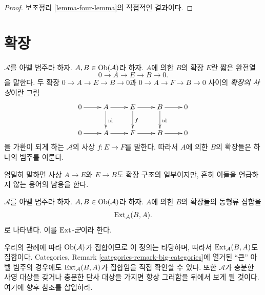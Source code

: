 \begin{proof}
보조정리 \ref{lemma-four-lemma}의 직접적인 결과이다.
\end{proof}








\section{확장}
\label{section-extensions}

\begin{definition}
\label{definition-extension}
$\mathcal{A}$를 아벨 범주라 하자.
$A, B \in \mathop{\mathrm{Ob}}\nolimits(\mathcal{A})$라 하자. {$A$에 의한 $B$의 확장 $E$}란
짧은 완전열
$$
0 \to A \to E \to B \to 0.
$$
을 말한다. 두 확장 $0 \to A \to E \to B \to 0$과
$0 \to A \to F \to B \to 0$ 사이의 {\it 확장의 사상}이란
그림
$$
\xymatrix{
0 \ar[r] &
A \ar[r] \ar[d]^{\text{id}} &
E \ar[r] \ar[d]^f &
B \ar[r] \ar[d]^{\text{id}} &
0 \\
0 \ar[r] &
A \ar[r] &
F \ar[r] &
B \ar[r] &
0
}
$$
을 가환이 되게 하는 $\mathcal{A}$의 사상 $f : E \to F$를 말한다.
따라서 $A$에 의한 $B$의 확장들은 하나의 범주를 이룬다.
\end{definition}

\noindent
엄밀히 말하면 사상 $A \to E$와 $E \to B$도 확장 구조의 일부이지만,
흔히 이들을 언급하지 않는 용어의 남용을 한다.

\begin{definition}
\label{definition-ext-group}
$\mathcal{A}$를 아벨 범주라 하자.
$A, B \in \mathop{\mathrm{Ob}}\nolimits(\mathcal{A})$라 하자. $A$에 의한 $B$의 확장들의
동형류 집합을
$$
\mathop{\mathrm{Ext}}\nolimits_\mathcal{A}(B, A).
$$
로 나타낸다. 이를 {\it $\mathop{\mathrm{Ext}}\nolimits$-군}이라 한다.
\end{definition}

\noindent
우리의 관례에 따라 $\mathop{\mathrm{Ob}}\nolimits(\mathcal{A})$가 집합이므로 이 정의는 타당하며,
따라서 $\mathop{\mathrm{Ext}}\nolimits_\mathcal{A}(B, A)$도 집합이다. Categories, Remark
\ref{categories-remark-big-categories}에 열거된 ``큰'' 아벨 범주의 경우에도
$\mathop{\mathrm{Ext}}\nolimits_\mathcal{A}(B, A)$가 집합임을 직접 확인할 수 있다.
또한 $\mathcal{A}$가 충분한 사영 대상을 갖거나 충분한 단사 대상을 가지면
항상 그러함을 뒤에서 보게 될 것이다. 여기에 향후 참조를 삽입하라.

